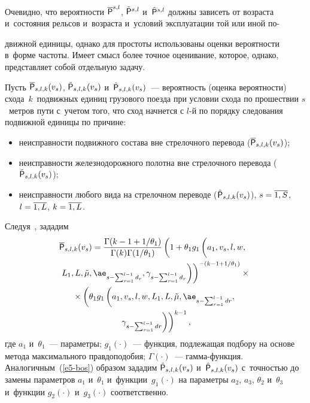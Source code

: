 \begin{multicols}{2}
     Очевидно, что вероятности $\overline{\sf P}^{s,l}$, $\tilde{\sf P}^{s,l}$ 
и~$\hat{\sf P}^{s,l}$ долж\-ны зависеть от возраста и~со\-сто\-яния рельсов и~возрас\-та 
и~условий эксплуатации той или иной по-\linebreak\vspace*{-12pt}

\pagebreak

\noindent
движной единицы, однако для прос\-то\-ты 
использованы оценки ве\-ро\-ят\-ности в~форме час\-то\-ты. Имеет смысл более точ\-ное 
оценивание, которое, однако, пред\-став\-ля\-ет собой отдельную задачу.
     
     Пусть $\overline{\sf P}_{s,l,k}(v_s)$, $\tilde{\sf P}_{s,l,k}(v_s)$ 
и~$\hat{\sf P}_{s,l,k}(v_s)$~--- ве\-ро\-ят\-ность (оцен\-ка ве\-ро\-ят\-ности) схода~$k$~по\-движ\-ных 
единиц грузового поезда при условии схода по прошествии $s$~мет\-ров пути 
с~учетом того, что сход начнется с $l$-й по порядку следования по\-движ\-ной единицы 
по причине: 
     \begin{itemize}
\item неисправности подвижного состава вне стрелочного перевода 
($\overline{\sf P}_{s,l,k}(v_s)$);
\item неисправности железнодорожного полотна вне стрелочного перевода 
($\tilde{\sf P}_{s,l,k}(v_s)$);
\item неисправности любого вида на стрелочном переводе 
($\hat{\sf P}_{s,l,k}(v_s)$), $s\hm= \overline{1,S}$, $l\hm= \overline{1,L}$, $k\hm= 
\overline{1,L}$.
\end{itemize}
     Следуя~\cite{6-bos, 7-bos}, зададим 
     \begin{multline*}
     \hspace*{-3pt}\overline{\sf P}_{s,l,k} (v_s) =\fr{\Gamma(k-1+1/\theta_1) } 
{\Gamma(k)\Gamma(1/\theta_1)}\left( 1+ \theta_1 g_1\left(
\vphantom{\ae_{s-\sum\nolimits^{l-1}_{r=1} d_r}}
a_1, v_s, l, w,\right.\right.\\ 
\left.\left. L_1, L, 
\tilde{\mu}, \ae_{s-\sum\nolimits^{l-1}_{r=1} d_r}, \gamma_{s-\sum\nolimits^{l-
1}_{r=1} d_r}\right)\right)^{-(k-1+1/\theta_1)}\times{}\\
     {}\times
     \left( \theta_1 g_1\left( a_1, v_s,l,w,L_1, L, \tilde{\mu}, \ae_{s-\sum\nolimits^{l-1}_{r=1} dr},\right.\right.\\
     \left.\left. 
     \gamma_{s-\sum\nolimits_{r=1}^{l-1} dr}\right)\right)^{k-1},
     \end{multline*}
где $a_1$ и~$\theta_1$~--- па\-ра\-мет\-ры; $g_1(\cdot)$~--- функция, под\-ле\-жа\-щая 
подбору на основе метода максимального прав\-до\-по\-до\-бия; $\Gamma(\cdot)$~---  
гам\-ма-функ\-ция. Аналогичным~(\ref{e5-bos}) образом зададим 
$\tilde{\sf P}_{s,l,k}(v_s)$ и~$\hat{\sf P}_{s,l,k}(v_s)$ с~точ\-ностью до замены па\-ра\-мет\-ров 
$a_1$ и~$\theta_1$ и~функции~$g_1(\cdot)$ на па\-ра\-мет\-ры $a_2$, $a_3$, $\theta_2$ 
и~$\theta_3$ и~функции $g_2(\cdot)$ и~$g_3(\cdot)$ соответственно.
     

\end{multicols}
